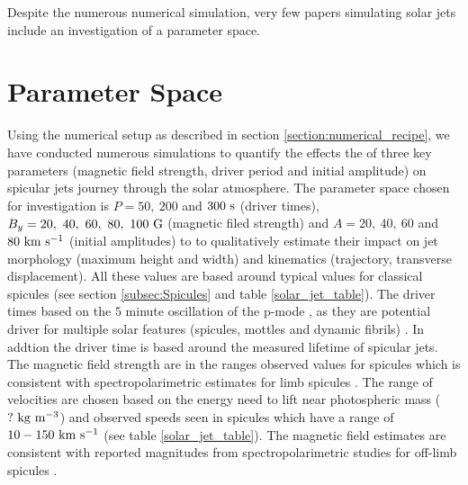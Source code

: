 \documentclass[12pt]{ociamthesis}
\newcommand{\kms}{~\rm{km ~s^{-1}}}
\newcommand{\kgm}{~\rm{kg ~m^{-3}}}
\newcommand{\np}{\\ \\}
\begin{document}
Despite the numerous numerical simulation, very few papers simulating solar jets include an investigation of a parameter space.
\section{Parameter Space}
\label{subsec:paramater_space}
Using the numerical setup as described in section \ref{section:numerical_recipe}, we have conducted numerous simulations to quantify the effects the of three key parameters (magnetic field strength, driver period and initial amplitude) on spicular jets journey through the solar atmosphere. The parameter space chosen for investigation is $P=50,~200$ and $300~\rm{s}$ (driver times), $B_y=20,~40,~60,~80,~100~\rm{G}$ (magnetic filed strength) and $A=20,~40,~60$ and $80 \kms$ (initial amplitudes) to to qualitatively estimate their impact on jet morphology (maximum height and width) and kinematics (trajectory, transverse displacement). All these values are based around typical values for classical spicules (see section \ref{subsec:Spicules} and table \ref{solar_jet_table}). The driver times based on the $5$ minute oscillation of the p-mode \citep{Leighton1962ApJ135474L}, as they are potential driver for multiple solar features (spicules, mottles  and dynamic fibrils) \citep{Pontieu2004Natur}. In addtion the driver time is based around the measured lifetime of spicular jets. The magnetic field strength are in the ranges observed values for spicules which is consistent with spectropolarimetric estimates for limb spicules \citep{centeno2010, suarez2015}. The range of velocities are chosen based on the energy need to lift near photospheric mass ($?\kgm$) and observed speeds seen in spicules which have a range of $10-150\kms$ (see table \ref{solar_jet_table}). The magnetic field estimates are consistent with reported magnitudes from spectropolarimetric studies for off-limb spicules \citep{centeno2010, suarez2015}. \np
\end{document}

